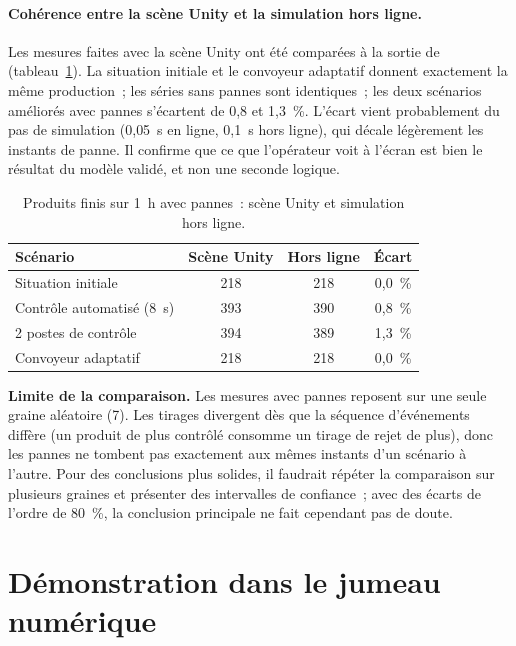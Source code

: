 \paragraph{Cohérence entre la scène Unity et la simulation hors ligne.} Les mesures faites avec la scène Unity ont été comparées à la sortie de  (tableau~\ref{tab:coherence}). La situation initiale et le convoyeur adaptatif donnent exactement la même production~; les séries sans pannes sont identiques~; les deux scénarios améliorés avec pannes s'écartent de 0{,}8 et 1{,}3~\%. L'écart vient probablement du pas de simulation (0{,}05~s en ligne, 0{,}1~s hors ligne), qui décale légèrement les instants de panne. Il confirme que ce que l'opérateur voit à l'écran est bien le résultat du modèle validé, et non une seconde logique.

\begin{table}[H]
\centering
\caption{Produits finis sur 1~h avec pannes~: scène Unity et simulation hors ligne.}
\label{tab:coherence}
\begin{tabular}{@{}lccc@{}}
\toprule
\textbf{Scénario} & \textbf{Scène Unity} & \textbf{Hors ligne} & \textbf{Écart} \\
\midrule
Situation initiale & 218 & 218 & 0{,}0~\% \\
Contrôle automatisé (8~s) & 393 & 390 & 0{,}8~\% \\
2 postes de contrôle & 394 & 389 & 1{,}3~\% \\
Convoyeur adaptatif & 218 & 218 & 0{,}0~\% \\
\bottomrule
\end{tabular}
\end{table}

\begin{warn}
\textbf{Limite de la comparaison.} Les mesures avec pannes reposent sur une seule graine aléatoire (7). Les tirages divergent dès que la séquence d'événements diffère (un produit de plus contrôlé consomme un tirage de rejet de plus), donc les pannes ne tombent pas exactement aux mêmes instants d'un scénario à l'autre. Pour des conclusions plus solides, il faudrait répéter la comparaison sur plusieurs graines et présenter des intervalles de confiance~; avec des écarts de l'ordre de 80~\%, la conclusion principale ne fait cependant pas de doute.
\end{warn}

\section{Démonstration dans le jumeau numérique}

